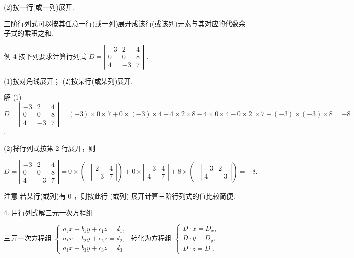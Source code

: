 \documentclass[10pt]{article}
\begin{document}
(2)按一行(或一列)展开.

三阶行列式可以按其任意一行(或一列)展开成该行(或该列)元素与其对应的代数余子式的乘积之和.

例 4 按下列要求计算行列式 \(D = \left| \begin{matrix}  - 3 & 2 & 4 \\  0 & 0 & 8 \\  4 &  - 3 & 7 \end{matrix}\right|\) .

(1)按对角线展开； (2)按某行(或某列)展开.

解 (1) \(D = \left| \begin{matrix}  - 3 & 2 & 4 \\  0 & 0 & 8 \\  4 &  - 3 & 7 \end{matrix}\right|  = \left( {-3}\right)  \times  0 \times  7 + 0 \times  \left( {-3}\right)  \times  4 + 4 \times  2 \times  8 - 4 \times  0 \times  4 - 0 \times  2 \; \times  7 - \left( {-3}\right)  \times  \left( {-3}\right)  \times  8 =  - 8\) .

(2)将行列式按第 2 行展开，则

\[
D = \left| \begin{matrix}  - 3 & 2 & 4 \\  0 & 0 & 8 \\  4 &  - 3 & 7 \end{matrix}\right|  = 0 \times  \left( {-\left| \begin{matrix} 2 & 4 \\   - 3 & 7 \end{matrix}\right| }\right)  + 0 \times  \left| \begin{matrix}  - 3 & 4 \\  4 & 7 \end{matrix}\right|  + 8 \times  \left( {-\left| \begin{matrix}  - 3 & 2 \\  4 &  - 3 \end{matrix}\right| }\right)  =  - 8.
\]

注意 若某行(或列)有 0 ，则按此行 (或列) 展开计算三阶行列式的值比较简便.

4. 用行列式解三元一次方程组

三元一次方程组 \(\left\{  \begin{array}{l} {a}_{1}x + {b}_{1}y + {c}_{1}z = {d}_{1}, \\  {a}_{2}x + {b}_{2}y + {c}_{2}z = {d}_{2}, \\  {a}_{3}x + {b}_{3}y + {c}_{3}z = {d}_{3} \end{array}\right.\) 转化为方程组 \(\left\{  \begin{array}{l} D \cdot  x = {D}_{x}, \\  D \cdot  y = {D}_{y}, \\  D \cdot  z = {D}_{z}, \end{array}\right.\)
\end{document}
